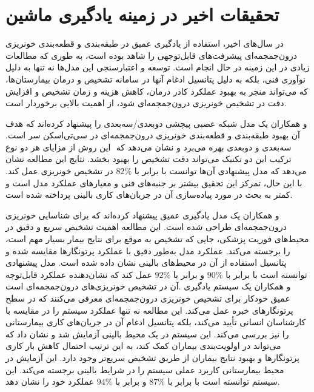 \section{تحقیقات اخیر در زمینه یادگیری ماشین}

در سال‌های اخیر، استفاده از یادگیری عمیق در طبقه‌بندی و قطعه‌بندی خونریزی درون‌جمجمه‌ای پیشرفت‌های قابل‌توجهی را شاهد بوده است، به طوری که مطالعات زیادی در این زمینه در حال انجام است. توسعه و اعتبارسنجی این مدل‌ها نه تنها به دلیل نوآوری فنی، بلکه به دلیل پتانسیل ادغام آنها در سامانه تشخیص و درمان بیمارستان‌ها، که می‌تواند منجر به بهبود عملکرد کادر درمان، کاهش هزینه و زمان تشخیص و افزایش دقت در تشخیص خونریزی درون‌جمجمه‌ای شود، از اهمیت بالایی برخوردار است.

و همکاران یک مدل شبکه عصبی پیچشی
 دوبعدی/سه‌بعدی را پیشنهاد کرده‌اند که هدف آن بهبود طبقه‌بندی و قطعه‌بندی خونریزی درون‌‌جمجمه‌ای در سی‌تی‌اسکن سر است. این روش از مزایای هر دو نوع
  ‎ سه‌بعدی و دو‌بعدی بهره می‌برد و نشان می‌دهد که ترکیب این دو تکنیک می‌تواند دقت تشخیص را بهبود بخشد. نتایج این مطالعه نشان می‌دهد که مدل پیشنهادی آن‌ها توانست با  
  برابر با
  \(82\%\)
  در تشخیص خونریزی عمل کند. با این حال، تمرکز این تحقیق بیشتر بر جنبه‌های فنی و معیارهای عملکرد مدل است و کمتر به بحث در مورد پیاده‌سازی آن در جریان‌های کاری بالینی پرداخته شده است\cite{chang2018hybrid}.

 و همکاران یک مدل یادگیری عمیق پیشنهاد کرده‌اند که برای شناسایی خونریزی درون‌جمجمه‌ای طراحی شده است. این مطالعه اهمیت تشخیص سریع و دقیق در محیط‌های فوریت پزشکی، جایی که تشخیص به موقع برای نتایج بیمار بسیار مهم است، را برجسته می‌کند. عملکرد مدل به‌طور دقیق با عملکرد پرتونگار‌ها مقایسه شده و پتانسیل استفاده از آن در محیط‌های بالینی نشان داده شده است. مدل پیشنهادی توانسته است با
 برابر با 
 \(90\%\)
 و 
  برابر با 
 \(92\%\)
 عمل کند که نشان‌دهنده عملکرد قابل‌توجه آن در تشخیص خونریزی‌های درون‌جمجمه‌ای است‎\cite{chilamkurthy2018deep}.
  و همکاران یک سیستم یادگیری عمیق خودکار برای تشخیص خونریزی درون‌جمجمه‌ای معرفی می‌کنند که در سطح پرتونگار‌های خبره عمل می‌کند. این مطالعه نه تنها عملکرد سیستم را در مقایسه با کارشناسان انسانی تأیید می‌کند، بلکه پتانسیل ادغام آن در جریان‌های کاری بیمارستانی را نیز بررسی می‌کند. این سیستم در یک محیط بالینی آزمایش شد و نشان داد که می‌تواند در اولویت‌بندی بیماران کمک کند، به این ترتیب احتمال کاهش بار کاری پرتونگار‌ها و بهبود نتایج بیماران از طریق تشخیص سریع‌تر وجود دارد. این آزمایش در محیط بیمارستانی کاربرد عملی سیستم را در شرایط بالینی برجسته می‌کند. این سیستم توانسته است با 
 برابر با 
 \(87\%\)
 و 
 برابر با 
 \(94\%\)
 عملکرد خود را نشان دهد‎\cite{titano2018automated}.

